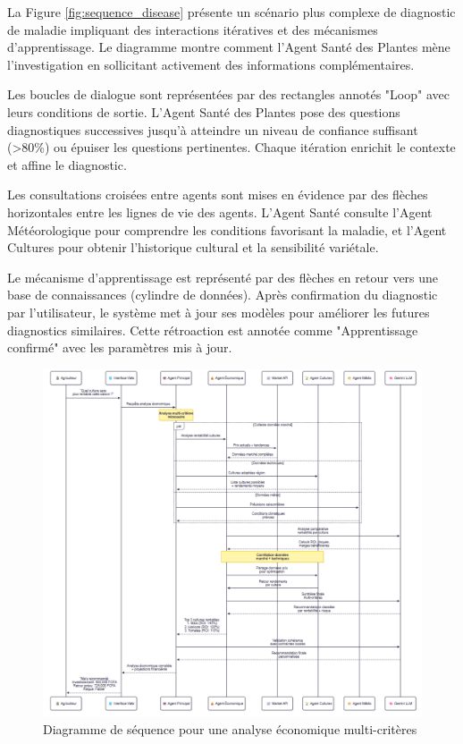 La Figure \ref{fig:sequence_disease} présente un scénario plus complexe de diagnostic de maladie impliquant des interactions itératives et des mécanismes d'apprentissage. Le diagramme montre comment l'Agent Santé des Plantes mène l'investigation en sollicitant activement des informations complémentaires.

Les boucles de dialogue sont représentées par des rectangles annotés "Loop" avec leurs conditions de sortie. L'Agent Santé des Plantes pose des questions diagnostiques successives jusqu'à atteindre un niveau de confiance suffisant (>80\%) ou épuiser les questions pertinentes. Chaque itération enrichit le contexte et affine le diagnostic.

Les consultations croisées entre agents sont mises en évidence par des flèches horizontales entre les lignes de vie des agents. L'Agent Santé consulte l'Agent Météorologique pour comprendre les conditions favorisant la maladie, et l'Agent Cultures pour obtenir l'historique cultural et la sensibilité variétale.

Le mécanisme d'apprentissage est représenté par des flèches en retour vers une base de connaissances (cylindre de données). Après confirmation du diagnostic par l'utilisateur, le système met à jour ses modèles pour améliorer les futures diagnostics similaires. Cette rétroaction est annotée comme "Apprentissage confirmé" avec les paramètres mis à jour.

\begin{figure}[H]
\centering
\includegraphics[width=1\textwidth]{images/sequence_diagram_economic.png}
\caption{Diagramme de séquence pour une analyse économique multi-critères}
\label{fig:sequence_economic}
\end{figure}

